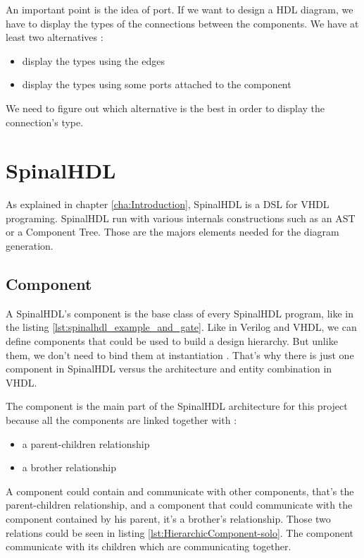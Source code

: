 An important point is the idea of port. If we want to design a HDL diagram, we
have to display the types of the connections between the components. We have at
least two alternatives :
\begin{itemize}
 \item display the types using the edges
 \item display the types using some ports attached to the component
\end{itemize}

We need to figure out which alternative is the best in order to display the
connection's type.

\section{SpinalHDL}
\label{sec:SpinalHDL}

As explained in chapter \ref{cha:Introduction}, SpinalHDL is a DSL for VHDL
programing. SpinalHDL run with various internals constructions such as an AST or
a Component Tree. Those are the majors elements needed for the diagram generation.

\subsection{Component}
\label{sub:Component}

A SpinalHDL's component is the base class of every SpinalHDL program, like in
the listing \ref{lst:spinalhdl_example_and_gate}. Like in Verilog and VHDL, we
can define components that could be used to build a design hierarchy. But unlike
them, we don’t need to bind them at instantiation \cite{github-spinalhdl}.
That's why there is just one component in SpinalHDL versus the architecture and entity
combination in VHDL.

The component is the main part of the SpinalHDL architecture for this project
because all the components are linked together with :
\begin{itemize}
    \item a parent-children relationship
    \item a brother relationship
\end{itemize}

A component could contain and communicate with other components, that's the
parent-children relationship, and a component that could communicate with the
component contained by his parent, it's a brother's relationship. Those two
relations could be seen in listing \ref{lst:HierarchicComponent-solo}. The
component communicate with its children which are communicating together.

